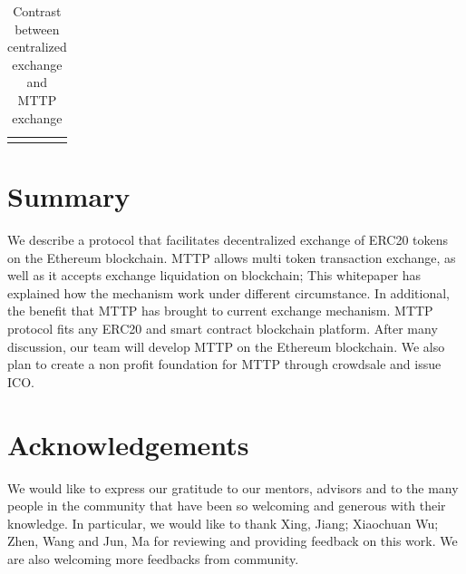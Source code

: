 \documentclass[UTF8,nofonts]{article}
\begin{document}
\begin{table}[hbt]
\begin{tabular}{p{5cm}|p{2.5cm}|p{2.5cm}}
{  \end{tabular}

\caption{Contrast between centralized exchange and MTTP exchange} %
\end{table}



\section{Summary\label{sec: summary}}

We describe a protocol that facilitates decentralized exchange of ERC20 tokens on the Ethereum blockchain. MTTP allows multi token transaction exchange,  as well as it accepts exchange liquidation on blockchain; This whitepaper has explained how the mechanism work under different circumstance. In additional,  the benefit that MTTP has brought to current exchange mechanism.
MTTP protocol fits any ERC20 and smart contract blockchain platform. After many discussion,  our team will develop MTTP on the Ethereum blockchain.
We also plan to create a non profit foundation for MTTP through crowdsale and issue ICO.

\section{Acknowledgements\label{sec: acknowledgement}}

We would like to express our gratitude to our mentors,  advisors and to the many people in the community that have been so welcoming and generous with their knowledge. In particular,  we would like to thank Xing,  Jiang; Xiaochuan Wu; Zhen, Wang and Jun, Ma for reviewing and providing feedback on this work. We are also welcoming more feedbacks from community.

\newpage


\end{document}
